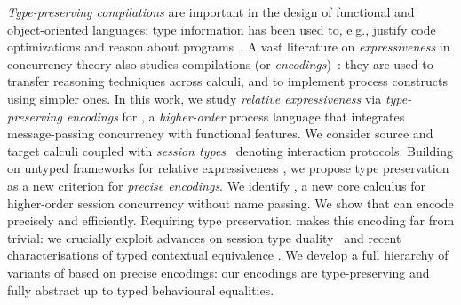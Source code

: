 \documentclass[runningheads]{llncs}
\begin{document}
\emph{Type-preserving compilations} are important in the design of
functional and object-oriented languages: type information has been
used to, e.g., justify code optimizations and reason about programs~\cite{DBLP:journals/toplas/MorrisettWCG99,DBLP:conf/pldi/ShaoA95,DBLP:journals/toplas/LeagueST02}.
A vast literature on 
{\em expressiveness} 
in concurrency theory
also studies compilations (or \emph{encodings})~\cite{Palamidessi03,DBLP:journals/iandc/Gorla10,DBLP:journals/tcs/FuL10,DBLP:conf/icalp/LanesePSS10,DBLP:journals/corr/PetersG15}:
they are used to transfer reasoning techniques 
across calculi,
and to 
implement process constructs using simpler ones.
In this work, we study 
{\em relative expressiveness} 
via \emph{type-preserving encodings} for \HOp, a \emph{higher-order} 
process language that integrates message-passing concurrency with functional features.
We consider source and target calculi coupled with \emph{session types}~\cite{honda.vasconcelos.kubo:language-primitives} denoting interaction protocols. 
Building on untyped frameworks for relative expressiveness
\cite{DBLP:journals/iandc/Gorla10}, 
we propose type preservation as a {new criterion} for \emph{precise encodings}.
We identify \HO, a new core calculus for higher-order session concurrency without
name passing. 
We show that \HO can encode \HOp precisely and efficiently. 
Requiring  
type preservation makes
this encoding far from trivial: we crucially exploit advances on
session type duality~\cite{TGC14,DBLP:journals/corr/abs-1202-2086} and recent
characterisations of typed contextual equivalence \cite{characteristic_bis}.
We develop a full hierarchy of variants of \HOp based on 
precise encodings: %
our encodings are
type-preserving and fully abstract up to typed
behavioural equalities. 
\end{document}
